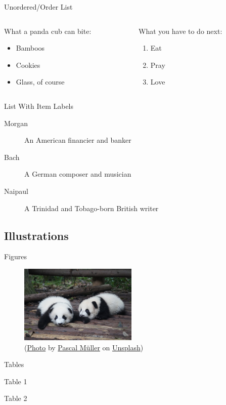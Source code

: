 \begin{frame}{Unordered/Order List}
	\begin{columns}
		\begin{column}{0.5\textwidth}
			What a panda cub can bite:
			\begin{itemize}
				\item Bamboos
				\item Cookies
				\item Glass, of course
			\end{itemize}
		\end{column}

		\begin{column}{0.5\textwidth}
			What you have to do next:
			\begin{enumerate}
				\item Eat
				\item Pray
				\item Love
			\end{enumerate}
		\end{column}
	\end{columns}
\end{frame}

\begin{frame}{List With Item Labels}
	\begin{description}
		\item[Morgan] An American financier and banker
		\item[Bach] A German composer and musician
		\item[Naipaul] A Trinidad and Tobago-born British writer
	\end{description}
\end{frame}

\subsection{Illustrations}

\begin{frame}{Figures}
	\begin{figure}[ht]
		\includegraphics[width = 0.5\textwidth]{Figures/Panda_Cubs.jpg}
		\caption{(\href{https://unsplash.com/photos/4EajIuUxgAQ}{Photo} by \href{https://unsplash.com/@millerthachiller}{Pascal M\"{u}ller} on \href{https://unsplash.com/}{Unsplash})}
	\end{figure}
\end{frame}

\begin{frame}{Tables}
	\begin{table}[ht]
		\centering
		
		\caption{Table 1}
	\end{table}

	\begin{table}[ht]
		\centering
		
		\caption{Table 2}
	\end{table}
\end{frame}
